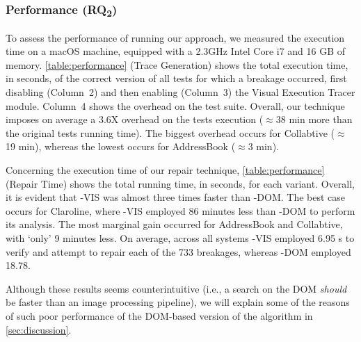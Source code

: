 \subsubsection{Performance (RQ\textsubscript{2})}\label{sec:performance}

\begin{table}[b]
\setlength{\tabcolsep}{0.9pt}
\renewcommand{\arraystretch}{0.9}
\centering
\caption{Performance results}
\label{table:performance}
\end{table}

To assess the performance of running our approach, we measured the execution time on a macOS machine, equipped with a 2.3GHz Intel Core i7 and 16 GB of memory.
\autoref{table:performance} (Trace Generation) shows the total execution time, in seconds, of the correct version of all tests for which a breakage occurred, first disabling (Column~2) and then enabling (Column~3) the Visual Execution Tracer module. Column~4 shows the overhead on the test suite.
Overall, our technique imposes on average a 3.6X overhead on the tests execution ($\approx$38 min more than the original tests running time). The biggest overhead occurs for Collabtive ($\approx$19 min), whereas the lowest occurs for AddressBook ($\approx$3 min). 

Concerning the execution time of our repair technique, \autoref{table:performance} (Repair Time) shows the total running time, in seconds, for each variant. Overall, it is evident that \tool-VIS was almost three times faster than \tool-DOM. The best case occurs for Claroline, where \tool-VIS employed 86 minutes less than \tool-DOM to perform its analysis. The most marginal gain occurred for AddressBook and Collabtive, with `only' 9 minutes less. 
On average, across all systems \tool-VIS employed 6.95 s to verify and attempt to repair each of the 733 breakages, whereas \tool-DOM employed 18.78.

Although these results seems counterintuitive (i.e., a search on the DOM \textit{should} be faster than an image processing pipeline), we will explain some of the reasons of such poor performance of the DOM-based version of the algorithm in \autoref{sec:discussion}.







